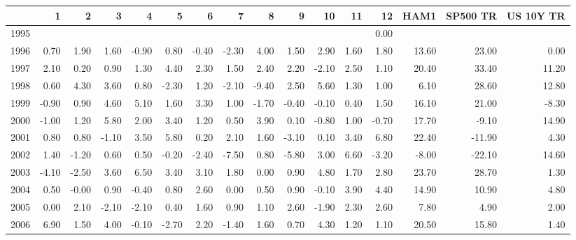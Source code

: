 \begin{tabular}{rrrrrrrrrrrrrrrr}
  \hline
 & 1 & 2 & 3 & 4 & 5 & 6 & 7 & 8 & 9 & 10 & 11 & 12 & HAM1 & SP500 TR & US 10Y TR \\ 
  \hline
1995 &  &  &  &  &  &  &  &  &  &  &  & 0.00 &  &  &  \\ 
  1996 & 0.70 & 1.90 & 1.60 & -0.90 & 0.80 & -0.40 & -2.30 & 4.00 & 1.50 & 2.90 & 1.60 & 1.80 & 13.60 & 23.00 & 0.00 \\ 
  1997 & 2.10 & 0.20 & 0.90 & 1.30 & 4.40 & 2.30 & 1.50 & 2.40 & 2.20 & -2.10 & 2.50 & 1.10 & 20.40 & 33.40 & 11.20 \\ 
  1998 & 0.60 & 4.30 & 3.60 & 0.80 & -2.30 & 1.20 & -2.10 & -9.40 & 2.50 & 5.60 & 1.30 & 1.00 & 6.10 & 28.60 & 12.80 \\ 
  1999 & -0.90 & 0.90 & 4.60 & 5.10 & 1.60 & 3.30 & 1.00 & -1.70 & -0.40 & -0.10 & 0.40 & 1.50 & 16.10 & 21.00 & -8.30 \\ 
  2000 & -1.00 & 1.20 & 5.80 & 2.00 & 3.40 & 1.20 & 0.50 & 3.90 & 0.10 & -0.80 & 1.00 & -0.70 & 17.70 & -9.10 & 14.90 \\ 
  2001 & 0.80 & 0.80 & -1.10 & 3.50 & 5.80 & 0.20 & 2.10 & 1.60 & -3.10 & 0.10 & 3.40 & 6.80 & 22.40 & -11.90 & 4.30 \\ 
  2002 & 1.40 & -1.20 & 0.60 & 0.50 & -0.20 & -2.40 & -7.50 & 0.80 & -5.80 & 3.00 & 6.60 & -3.20 & -8.00 & -22.10 & 14.60 \\ 
  2003 & -4.10 & -2.50 & 3.60 & 6.50 & 3.40 & 3.10 & 1.80 & 0.00 & 0.90 & 4.80 & 1.70 & 2.80 & 23.70 & 28.70 & 1.30 \\ 
  2004 & 0.50 & -0.00 & 0.90 & -0.40 & 0.80 & 2.60 & 0.00 & 0.50 & 0.90 & -0.10 & 3.90 & 4.40 & 14.90 & 10.90 & 4.80 \\ 
  2005 & 0.00 & 2.10 & -2.10 & -2.10 & 0.40 & 1.60 & 0.90 & 1.10 & 2.60 & -1.90 & 2.30 & 2.60 & 7.80 & 4.90 & 2.00 \\ 
  2006 & 6.90 & 1.50 & 4.00 & -0.10 & -2.70 & 2.20 & -1.40 & 1.60 & 0.70 & 4.30 & 1.20 & 1.10 & 20.50 & 15.80 & 1.40 \\ 
   \hline
\end{tabular}
